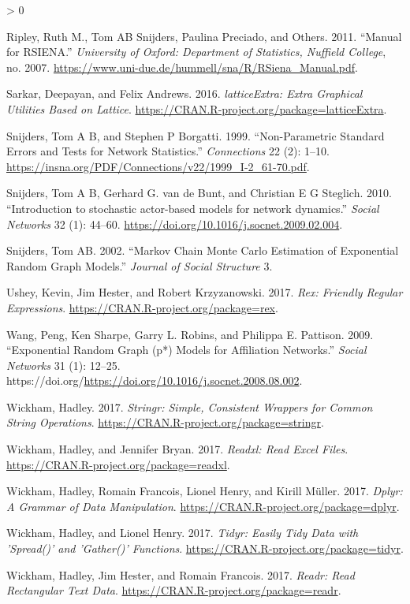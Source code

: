 \documentclass[
]{book}
\newlength{\cslhangindent}
\newenvironment{CSLReferences}[2] %
 {%
  \setlength{\parindent}{0pt}
  \ifodd #1 \everypar{\setlength{\hangindent}{\cslhangindent}}\ignorespaces\fi
  \ifnum #2 > 0
  \setlength{\parskip}{#2\baselineskip}
  \fi
 }%
 {}
\begin{document}
\begin{CSLReferences}{1}{0}
\leavevmode\hypertarget{ref-Ripley2011}{}%
Ripley, Ruth M., Tom AB Snijders, Paulina Preciado, and Others. 2011. {``{Manual for RSIENA}.''} \emph{University of Oxford: Department of Statistics, Nuffield College}, no. 2007. \url{https://www.uni-due.de/hummell/sna/R/RSiena_Manual.pdf}.

\leavevmode\hypertarget{ref-R-latticeExtra}{}%
Sarkar, Deepayan, and Felix Andrews. 2016. \emph{latticeExtra: Extra Graphical Utilities Based on Lattice}. \url{https://CRAN.R-project.org/package=latticeExtra}.

\leavevmode\hypertarget{ref-Snijders1999}{}%
Snijders, Tom A B, and Stephen P Borgatti. 1999. {``{Non-Parametric Standard Errors and Tests for Network Statistics}.''} \emph{Connections} 22 (2): 1--10. \url{https://insna.org/PDF/Connections/v22/1999_I-2_61-70.pdf}.

\leavevmode\hypertarget{ref-Snijders2010}{}%
Snijders, Tom A B, Gerhard G. van de Bunt, and Christian E G Steglich. 2010. {``{Introduction to stochastic actor-based models for network dynamics}.''} \emph{Social Networks} 32 (1): 44--60. \url{https://doi.org/10.1016/j.socnet.2009.02.004}.

\leavevmode\hypertarget{ref-Snijders2002}{}%
Snijders, Tom AB. 2002. {``Markov Chain Monte Carlo Estimation of Exponential Random Graph Models.''} \emph{Journal of Social Structure} 3.

\leavevmode\hypertarget{ref-R-rex}{}%
Ushey, Kevin, Jim Hester, and Robert Krzyzanowski. 2017. \emph{Rex: Friendly Regular Expressions}. \url{https://CRAN.R-project.org/package=rex}.

\leavevmode\hypertarget{ref-Wang2009}{}%
Wang, Peng, Ken Sharpe, Garry L. Robins, and Philippa E. Pattison. 2009. {``Exponential Random Graph (p*) Models for Affiliation Networks.''} \emph{Social Networks} 31 (1): 12--25. https://doi.org/\url{https://doi.org/10.1016/j.socnet.2008.08.002}.

\leavevmode\hypertarget{ref-R-stringr}{}%
Wickham, Hadley. 2017. \emph{Stringr: Simple, Consistent Wrappers for Common String Operations}. \url{https://CRAN.R-project.org/package=stringr}.

\leavevmode\hypertarget{ref-R-readxl}{}%
Wickham, Hadley, and Jennifer Bryan. 2017. \emph{Readxl: Read Excel Files}. \url{https://CRAN.R-project.org/package=readxl}.

\leavevmode\hypertarget{ref-R-dplyr}{}%
Wickham, Hadley, Romain Francois, Lionel Henry, and Kirill Müller. 2017. \emph{Dplyr: A Grammar of Data Manipulation}. \url{https://CRAN.R-project.org/package=dplyr}.

\leavevmode\hypertarget{ref-R-tidyr}{}%
Wickham, Hadley, and Lionel Henry. 2017. \emph{Tidyr: Easily Tidy Data with 'Spread()' and 'Gather()' Functions}. \url{https://CRAN.R-project.org/package=tidyr}.

\leavevmode\hypertarget{ref-R-readr}{}%
Wickham, Hadley, Jim Hester, and Romain Francois. 2017. \emph{Readr: Read Rectangular Text Data}. \url{https://CRAN.R-project.org/package=readr}.

\end{CSLReferences}
\end{document}

